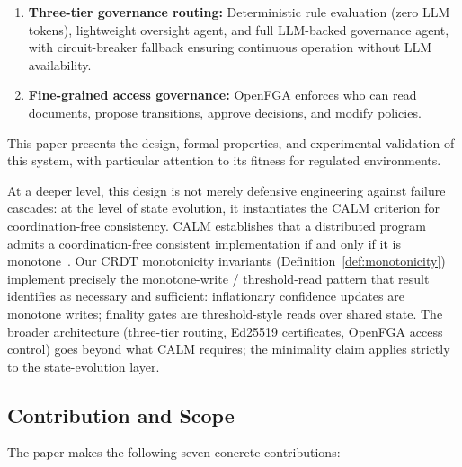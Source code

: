 \documentclass[11pt]{article}
\begin{document}
\begin{enumerate}
  \item \textbf{Three-tier governance routing:} Deterministic rule evaluation (zero LLM tokens), lightweight oversight agent, and full LLM-backed governance agent, with circuit-breaker fallback ensuring continuous operation without LLM availability.

  \item \textbf{Fine-grained access governance:} OpenFGA enforces who can read documents, propose transitions, approve decisions, and modify policies.
\end{enumerate}

This paper presents the design, formal properties, and experimental validation of this system, with particular attention to its fitness for regulated environments.

At a deeper level, this design is not merely defensive engineering against failure cascades: at the level of state evolution, it instantiates the CALM criterion for coordination-free consistency. CALM establishes that a distributed program admits a coordination-free consistent implementation if and only if it is monotone~\cite{hellerstein2019calm,ameloot2025calm}. Our CRDT monotonicity invariants (Definition~\ref{def:monotonicity}) implement precisely the monotone-write / threshold-read pattern that result identifies as necessary and sufficient: inflationary confidence updates are monotone writes; finality gates are threshold-style reads over shared state. The broader architecture (three-tier routing, Ed25519 certificates, OpenFGA access control) goes beyond what CALM requires; the minimality claim applies strictly to the state-evolution layer.

\subsection{Contribution and Scope}

The paper makes the following seven concrete contributions:
\end{document}
